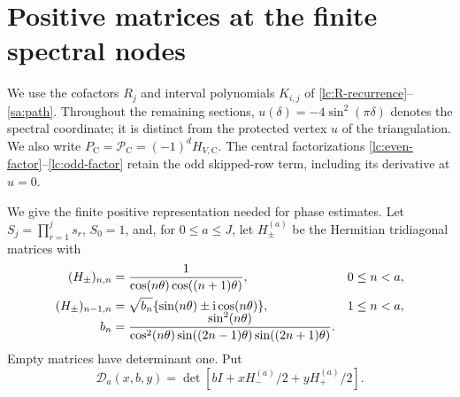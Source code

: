 \section{Positive matrices at the finite spectral nodes}\label{sa:finite}
We use the cofactors $R_j$ and interval polynomials $K_{i,j}$ of
\eqref{lc:R-recurrence}--\eqref{sa:path}. Throughout the remaining
sections, $u(\delta)=-4\sin^2(\pi\delta)$ denotes the spectral coordinate;
it is distinct from the protected vertex $u$ of the triangulation.
We also write $P_{\mathrm C}=\mathcal P_{\mathrm C}=(-1)^dH_{V,\mathrm C}$.
The central factorizations \eqref{lc:even-factor}--\eqref{lc:odd-factor}
retain the odd skipped-row term, including its derivative at $u=0$.

We give the finite positive representation needed for phase estimates.
Let $S_j=\prod_{r=1}^j s_r$, $S_0=1$, and, for $0\le a\le J$,
let $H_\pm^{(a)}$ be the Hermitian tridiagonal matrices with
\begin{align}
 (H_\pm)_{n,n}&=\frac1{\cos(n\theta)\cos((n+1)\theta)},
                              &&0\le n<a,\notag\\
 (H_\pm)_{n-1,n}&=\sqrt{b_n}\{\sin(n\theta)\pm\mathrm i\cos(n\theta)\},
                              &&1\le n<a,\label{sa:H}\\[-6pt]
 b_n&=\frac{\sin^2(n\theta)}{\cos^2(n\theta)
                  \sin((2n-1)\theta)\sin((2n+1)\theta)}.\notag
\end{align}
Empty matrices have determinant one. Put
\begin{equation}\label{sa:D}
 \mathcal D_a(x,b,y)=\det[bI+xH_-^{(a)}/2+yH_+^{(a)}/2].
\end{equation}

